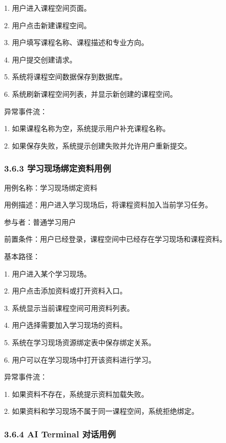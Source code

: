 \documentclass[10pt,a4paper,fontset=none]{ctexart}
\begin{document}
1. 用户进入课程空间页面。\par
2. 用户点击新建课程空间。\par
3. 用户填写课程名称、课程描述和专业方向。\par
4. 用户提交创建请求。\par
5. 系统将课程空间数据保存到数据库。\par
6. 系统刷新课程空间列表，并显示新创建的课程空间。\par

异常事件流：\par

1. 如果课程名称为空，系统提示用户补充课程名称。\par
2. 如果保存失败，系统提示创建失败并允许用户重新提交。\par

\subsubsection*{3.6.3 学习现场绑定资料用例}

用例名称：学习现场绑定资料\par

用例描述：用户进入学习现场后，将课程资料加入当前学习任务。\par

参与者：普通学习用户\par

前置条件：用户已经登录，课程空间中已经存在学习现场和课程资料。\par

基本路径：\par

1. 用户进入某个学习现场。\par
2. 用户点击添加资料或打开资料入口。\par
3. 系统显示当前课程空间可用资料列表。\par
4. 用户选择需要加入学习现场的资料。\par
5. 系统在学习现场资源绑定表中保存绑定关系。\par
6. 用户可以在学习现场中打开该资料进行学习。\par

异常事件流：\par

1. 如果资料不存在，系统提示资料加载失败。\par
2. 如果资料和学习现场不属于同一课程空间，系统拒绝绑定。\par

\subsubsection*{3.6.4 AI Terminal 对话用例}
\end{document}
